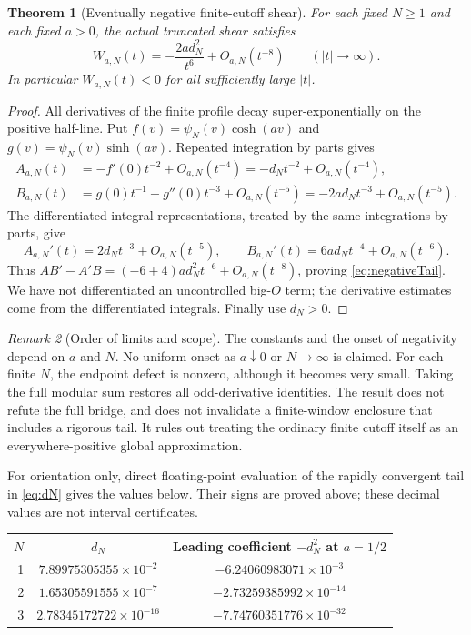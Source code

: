 \documentclass[11pt,letterpaper]{article}
\numberwithin{equation}{section}
\newtheorem{theorem}{Theorem}[section]
\theoremstyle{definition}
\theoremstyle{remark}
\newtheorem{remark}[theorem]{Remark}
\begin{document}
\begin{theorem}[Eventually negative finite-cutoff shear]\label{thm:cutoff}
For each fixed $N\ge1$ and each fixed $a>0$, the actual truncated shear satisfies
\begin{equation}\label{eq:negativeTail}
W_{a,N}(t)
=-\frac{2ad_N^2}{t^6}+O_{a,N}(t^{-8})
\qquad (|t|\to\infty).
\end{equation}
In particular $W_{a,N}(t)<0$ for all sufficiently large $|t|$.
\end{theorem}
\begin{proof}
All derivatives of the finite profile decay super-exponentially on the positive half-line. Put $f(v)=\psi_N(v)\cosh(av)$ and $g(v)=\psi_N(v)\sinh(av)$. Repeated integration by parts gives
\begin{align*}
A_{a,N}(t)&=-f'(0)t^{-2}+O_{a,N}(t^{-4})
=-d_Nt^{-2}+O_{a,N}(t^{-4}),\\
B_{a,N}(t)&=g(0)t^{-1}-g''(0)t^{-3}+O_{a,N}(t^{-5})
=-2ad_Nt^{-3}+O_{a,N}(t^{-5}).
\end{align*}
The differentiated integral representations, treated by the same integrations by parts, give
\[
A_{a,N}'(t)=2d_Nt^{-3}+O_{a,N}(t^{-5}),\qquad
B_{a,N}'(t)=6ad_Nt^{-4}+O_{a,N}(t^{-6}).
\]
Thus $AB'-A'B=(-6+4)ad_N^2t^{-6}+O_{a,N}(t^{-8})$, proving \eqref{eq:negativeTail}. We have not differentiated an uncontrolled big-$O$ term; the derivative estimates come from the differentiated integrals. Finally use $d_N>0$.
\end{proof}

\begin{remark}[Order of limits and scope]
The constants and the onset of negativity depend on $a$ and $N$. No uniform onset as $a\downarrow0$ or $N\to\infty$ is claimed. For each finite $N$, the endpoint defect is nonzero, although it becomes very small. Taking the full modular sum restores all odd-derivative identities. The result does not refute the full bridge, and does not invalidate a finite-window enclosure that includes a rigorous tail. It rules out treating the ordinary finite cutoff itself as an everywhere-positive global approximation.
\end{remark}

For orientation only, direct floating-point evaluation of the rapidly convergent tail in \eqref{eq:dN} gives the values below. Their signs are proved above; these decimal values are not interval certificates.
\begin{center}
\begin{tabular}{rcc}
\toprule
$N$ & $d_N$ & Leading coefficient $-d_N^2$ at $a=1/2$\\
\midrule
1 & $7.89975305355\times10^{-2}$ & $-6.24060983071\times10^{-3}$\\
2 & $1.65305591555\times10^{-7}$ & $-2.73259385992\times10^{-14}$\\
3 & $2.78345172722\times10^{-16}$ & $-7.74760351776\times10^{-32}$\\
\bottomrule
\end{tabular}
\end{center}
\end{document}
